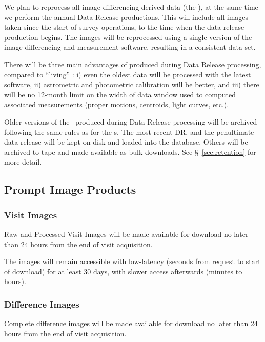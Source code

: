 \documentclass[SE,lsstdraft,toc]{lsstdoc}
\begin{document}
We plan to reprocess all image differencing-derived data (the \DB), at the same time we perform the annual Data Release productions. This will include all images taken since the start of survey operations, to the time when the data release production begins. The images will be reprocessed using a single version of the image differencing and measurement software, resulting in a consistent data set.

There will be three main advantages of \DB produced during Data Release processing, compared to
``living'' \DB:
i) even the oldest data will be processed with the latest software,
ii) astrometric and photometric calibration will be better, and
iii) there will be no 12-month limit on the width of data window used to computed associated \DIAObject
measurements (proper motions, centroids, light curves, etc.). 

Older versions of the \DB\ produced during Data Release processing will be archived following the same rules as for the \DR{}s. The most recent DR, and the penultimate data release will be kept on disk and loaded into the database. Others will be archived to tape and made available as bulk downloads. See \S~\ref{sec:retention} for more detail.

\subsection{Prompt Image Products}

\subsubsection{Visit Images}

Raw and Processed Visit Images will be made available for download no later than 24 hours from the end of visit acquisition.

The images will remain accessible with low-latency (seconds from request to start of download) for at least 30 days, with slower access afterwards (minutes to hours).

\subsubsection{Difference Images}
\label{sec:diffims}

Complete difference images will be made available for download no later than 24 hours from the end of visit acquisition.
\end{document}
